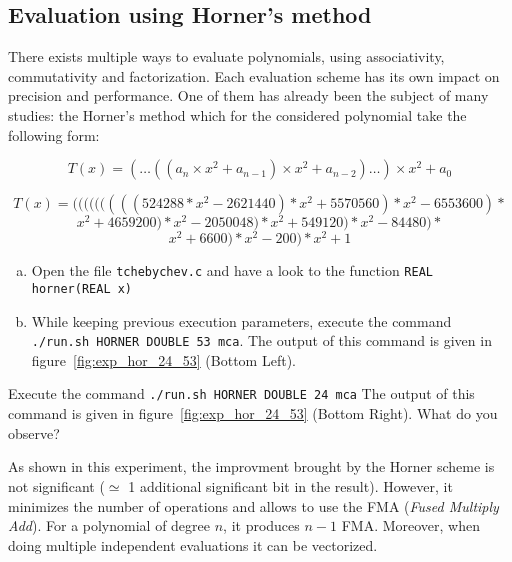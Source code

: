 \FloatBarrier

\subsection{Evaluation using Horner's method}
There exists multiple ways to evaluate polynomials, using associativity, commutativity and factorization.
Each evaluation scheme has its own impact on precision and performance.
One of them has already been the subject of many studies: the Horner's method which for the considered polynomial take the following form:

\[
	T(x) = (\dots((a_n\times x^2 + a_{n-1})\times x^2 + a_{n-2})\dots) \times x^2
    + a_0
\]

$$T(x) = (((((((((524288*x^2-2621440)*x^2+5570560)*x^2-6553600)*$$
$$x^2+4659200)*x^2-2050048)*x^2+549120)*x^2-84480)*$$
$$x^2+6600)*x^2-200)*x^2+1$$

\begin{question}
  \begin{enumerate}[(a)]
  \item Open the file {\tt tchebychev.c} and have a look to the function {\tt REAL horner(REAL x)}
\item While keeping previous execution parameters, execute the command {\tt ./run.sh HORNER DOUBLE 53 mca}.  \newline The output of this command is given in figure~\ref{fig:exp_hor_24_53} (Bottom Left).
  \end{enumerate}
\end{question}

\begin{question}
\item Execute the command {\tt ./run.sh HORNER DOUBLE 24 mca}  \newline
The output of this command is given in figure~\ref{fig:exp_hor_24_53} (Bottom Right).
What do you observe?
\end{question}

As shown in this experiment, the improvment brought by the Horner scheme is not significant ($\simeq$ 1 additional significant bit in the result). 
 However, it minimizes the
number of operations and allows to use the FMA ({\it Fused Multiply Add}). For
a polynomial of degree $n$, it produces $n-1$ FMA. Moreover, when doing
multiple independent evaluations it can be vectorized.

